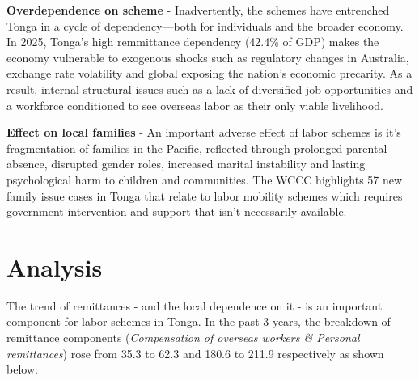 \documentclass[9pt,a4paper,twocolumn,twoside]{tau-class/tau}
\begin{document}

\textbf{Overdependence on scheme} - Inadvertently, the schemes have entrenched Tonga in a cycle of dependency—both for individuals and the broader economy. In 2025, Tonga's high remmittance dependency (42.4\% of GDP) makes the economy vulnerable to exogenous shocks such as regulatory changes in Australia, exchange rate volatility and global exposing the nation’s economic precarity. As a result, internal structural issues such as a lack of diversified job opportunities and a workforce conditioned to see overseas labor as their only viable livelihood.







   \textbf{Effect on local families} - An important adverse effect of labor schemes is it's fragmentation of families in the Pacific, reflected through prolonged parental absence, disrupted gender roles, increased marital instability and lasting psychological harm to children and communities. The WCCC highlights 57 new family issue cases in Tonga that relate to labor mobility schemes which requires government intervention and support that isn't necessarily available.

	
\section{Analysis}

    The trend of remittances - and the local dependence on it -  is an important component for labor schemes in Tonga. In the past 3 years, the breakdown of remittance components (\textit{Compensation of overseas workers \& Personal remittances}) rose from 35.3 to 62.3 and 180.6 to 211.9 respectively as shown below: 
\end{document}
